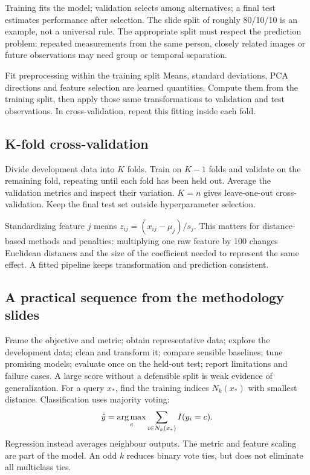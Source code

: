 \documentclass[11pt]{article}
\begin{document}
Training fits the model; validation selects among alternatives; a final test estimates performance after selection. The slide split of roughly 80/10/10 is an example, not a universal rule. The appropriate split must respect the prediction problem: repeated measurements from the same person, closely related images or future observations may need group or temporal separation.
\begin{keyidea}{Fit preprocessing within the training split}
Means, standard deviations, PCA directions and feature selection are learned quantities. Compute them from the training split, then apply those same transformations to validation and test observations. In cross-validation, repeat this fitting inside each fold.
\end{keyidea}
\subsection{K-fold cross-validation}
Divide development data into $K$ folds. Train on $K-1$ folds and validate on the remaining fold, repeating until each fold has been held out. Average the validation metrics and inspect their variation. $K=n$ gives leave-one-out cross-validation. Keep the final test set outside hyperparameter selection.

Standardizing feature $j$ means $z_{ij}=(x_{ij}-\mu_j)/s_j$. This matters for distance-based methods and penalties: multiplying one raw feature by 100 changes Euclidean distances and the size of the coefficient needed to represent the same effect. A fitted pipeline keeps transformation and prediction consistent.
\subsection{A practical sequence from the methodology slides}
Frame the objective and metric; obtain representative data; explore the development data; clean and transform it; compare sensible baselines; tune promising models; evaluate once on the held-out test; report limitations and failure cases. A large score without a defensible split is weak evidence of generalization.
For a query $x_*$, find the training indices $N_k(x_*)$ with smallest distance. Classification uses majority voting:
\[
\hat y=\operatorname*{arg\,max}_c\sum_{i\in N_k(x_*)}I(y_i=c).
\]
Regression instead averages neighbour outputs. The metric and feature scaling are part of the model. An odd $k$ reduces binary vote ties, but does not eliminate all multiclass ties.
\end{document}
